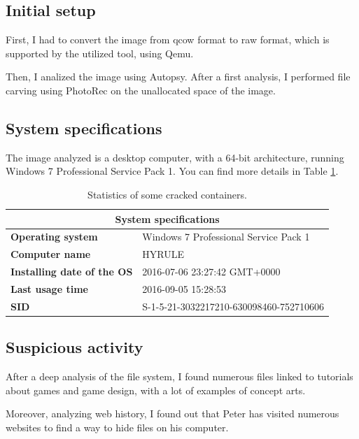 \documentclass[12pt]{article}
\begin{document}
\subsection{Initial setup}

First, I had to convert the image from qcow format to raw format, which is supported by the utilized tool, using Qemu.

Then, I analized the image using Autopsy. After a first analysis, I performed file carving using PhotoRec on the unallocated space of the image.

\subsection{System specifications}

The image analyzed is a desktop computer, with a 64-bit architecture, running Windows 7 Professional Service Pack 1. 
You can find more details in Table \ref{table:stats}.

\begin{table}[!ht]
    \centering
    \begin{tabular}{ll}
    \toprule
        \multicolumn{2}{c}{\textbf{System specifications}} \\
        \midrule
        \textbf{Operating system} & Windows 7 Professional Service Pack 1 \\
        \textbf{Computer name} & HYRULE \\
        \textbf{Installing date of the OS} & 2016-07-06 23:27:42 GMT+0000 \\
        \textbf{Last usage time} & 2016-09-05 15:28:53 \\
        \textbf{SID} & S-1-5-21-3032217210-630098460-752710606 \\
    \bottomrule
    \end{tabular}
    \caption{Statistics of some cracked containers.}
    \label{table:stats}
\end{table}

\subsection{Suspicious activity}

After a deep analysis of the file system, I found numerous files linked to tutorials about games and game design, with a lot of examples of concept arts. 

Moreover, analyzing web history, I found out that Peter has visited numerous websites to find a way to hide files on his computer. 
\end{document}
